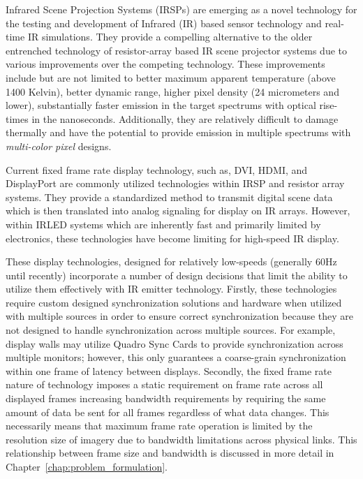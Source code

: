 \label{chap:introduction}

Infrared Scene Projection Systems (IRSPs) are emerging as a novel technology for the testing and development of Infrared (IR) based sensor technology and real-time IR simulations. They provide a compelling alternative to the older entrenched technology of resistor-array based IR scene projector systems\cite{PritchardEtAl1998,WilliamsEtAl2005} due to various improvements over the competing technology. These improvements include but are not limited to better maximum apparent temperature (above 1400 Kelvin), better dynamic range, higher pixel density (24 micrometers and lower), substantially faster emission in the target spectrums with optical rise-times in the nanoseconds. Additionally, they are relatively difficult to damage thermally and have the potential to provide emission in multiple spectrums with \emph{multi-color pixel} designs.

Current fixed frame rate display technology, such as, DVI\cite{DDWG1999}, HDMI\cite{HDMIForum2018}, and DisplayPort\cite{BhowmikEtAl2012} are commonly utilized technologies within IRSP and resistor array systems. They provide a standardized method to transmit digital scene data which is then translated into analog signaling for display on IR arrays. However, within IRLED systems which are inherently fast and primarily limited by electronics, these technologies have become limiting for high-speed IR display\cite{LaVeignePrewarski2013}.

These display technologies, designed for relatively low-speeds (generally 60Hz until recently) incorporate a number of design decisions that limit the ability to utilize them effectively with IR emitter technology. Firstly, these technologies require custom designed synchronization solutions and hardware when utilized with multiple sources in order to ensure correct synchronization because they are not designed to handle synchronization across multiple sources. For example, display walls may utilize Quadro Sync Cards\cite{NVIDIA2020_2} to provide synchronization across multiple monitors; however, this only guarantees  a coarse-grain synchronization within one frame of latency between displays. Secondly, the fixed frame rate nature of technology imposes a static requirement on frame rate across all displayed frames increasing bandwidth requirements by requiring the same amount of data be sent for all frames regardless of what data changes. This necessarily means that maximum frame rate operation is limited by the resolution size of imagery due to bandwidth limitations across physical links. This relationship between frame size and bandwidth is discussed in more detail in Chapter~\ref{chap:problem_formulation}.

